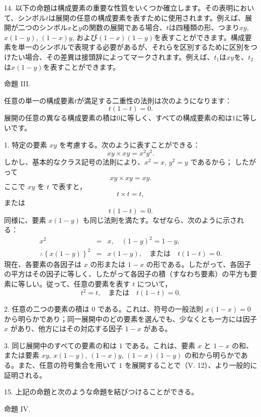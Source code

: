 \documentclass[a4paper,11pt,openany]{ltjsbook}
\begin{document}
14. 以下の命題は構成要素の重要な性質をいくつか確立します。その表明において、シンボル$t$は展開の任意の構成要素を表すために使用されます。例えば、展開が二つのシンボル$x$と$y$の関数の展開である場合、$t$は四種類の形、つまり$xy$, $x(1 - y)$, $(1 - x)y$, および$(1 - x)(1 - y)$を表すことができます。構成要素を単一のシンボルで表現する必要があるが、それらを区別するために区別をつけたい場合、その差異は接頭辞によってマークされます。例えば、$t_1$は$xy$を、$t_2$は$x(1 - y)$を表すことができます。

\begin{center}
\textsc{命題 III.}
\end{center}

任意の単一の構成要素$t$が満足する二重性の法則は次のようになります：
\[
t(1-t) = 0.
\]
展開の任意の異なる構成要素の積は$0$に等しく、すべての構成要素の和は$1$に等しいです。

1. 特定の要素 $xy$ を考慮する。次のように表すことができる：
\[
xy \times xy = x^2y^2.
\]
しかし、基本的なクラス記号の法則により、$x^2 = x$, $y^2 = y$ であるから；
したがって
\[
xy \times xy = xy.
\]
ここで $xy$ を $t$ で表すと，
\[
t \times t = t,
\]
または
\[
t(1 - t) = 0.
\]
同様に、要素 $x (1 - y)$ も同じ法則を満たす。なぜなら、次のように示される：
\begin{eqnarray*}
x^2 &=& x, \quad (1 - y)^2 = 1 - y, \\
\therefore \left\{x(1-y)\right\}^2 &=& x(1-y), \quad \textrm{または} \quad t(1-t) = 0.
\end{eqnarray*}
現在、各要素の各因子は $x$ の形または $1 - x$ の形である。したがって、各因子の平方はその因子に等しく、したがって各因子の積（すなわち要素）の平方も要素に等しい。従って、任意の要素を表す $t$ について，
\[
t^2 = t, \quad \textrm{または} \quad t(1 - t) = 0.
\]

2. 任意の二つの要素の積は $0$ である。これは、符号の一般法則 $x (1 - x) = 0$ から明らかであり；同一展開中のどの要素を選んでも、少なくとも一方には因子 $x$ があり、他方にはその対応する因子 $1 - x$ がある。

3. 同じ展開中のすべての要素の和は $1$ である。これは、要素 $x$ と $1 - x$ の和、または要素 $xy$, $x(1-y)$, $(1-x)y$, $(1-x)(1-y)$ の和から明らかである。また、任意の符号集合を用いて $1$ を展開することで（V. 12）、より一般的に証明される。

15. 上記の命題と次のような命題を結びつけることができる。

\begin{center}
\textsc{命題 IV.}
\end{center}
\end{document}
